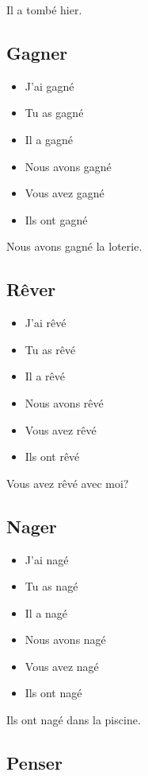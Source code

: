 Il a tombé hier.

\subsection{Gagner}

\begin{itemize}
    \item J'ai gagné
    \item Tu as gagné 
    \item Il a gagné
    \item Nous avons gagné 
    \item Vous avez gagné 
    \item Ils ont gagné 
\end{itemize}

Nous avons gagné la loterie.

\subsection{Rêver}

\begin{itemize}
    \item J'ai rêvé 
    \item Tu as rêvé 
    \item Il a rêvé 
    \item Nous avons rêvé 
    \item Vous avez rêvé 
    \item Ils ont rêvé
\end{itemize}

Vous avez rêvé avec moi?

\subsection{Nager}

\begin{itemize}
    \item J'ai nagé 
    \item Tu as nagé 
    \item Il a nagé 
    \item Nous avons nagé
    \item Vous avez nagé 
    \item Ils ont nagé
\end{itemize}

Ils ont nagé dans la piscine.

\subsection{Penser}


